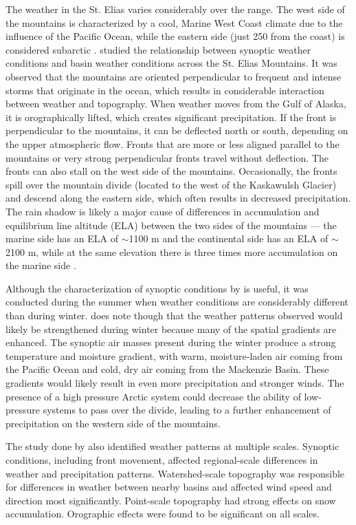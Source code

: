 \documentclass{sfuthesis}
\begin{document}
The weather in the St. Elias varies considerably over the range. The west side of the mountains is characterized by a cool, Marine West Coast climate due to the influence of the Pacific Ocean, while the eastern side (just 250 from the coast) is considered subarctic \citep{Marcus1970}. \cite{Taylor1969} studied the relationship between synoptic weather conditions and basin weather conditions across the St. Elias Mountains. It was observed that the mountains are oriented perpendicular to frequent and intense storms that originate in the ocean, which results in considerable interaction between weather and topography. When weather moves from the Gulf of Alaska, it is orographically lifted, which creates significant precipitation. If the front is perpendicular to the mountains, it can be deflected north or south, depending on the upper atmospheric flow. Fronts that are more or less aligned parallel to the mountains or very strong perpendicular fronts travel without deflection. The fronts can also stall on the west side of the mountains. Occasionally, the fronts spill over the mountain divide (located to the west of the Kaskawulsh Glacier) and descend along the eastern side, which often results in decreased precipitation. The rain shadow is likely a major cause of differences in accumulation and equilibrium line altitude (ELA) between the two sides of the mountains --- the marine side has an ELA of $\sim$1100 m and the continental side has an ELA of $\sim$2100 m, while at the same elevation there is three times more accumulation on the marine side \citep{Marcus1970}.

Although the characterization of synoptic conditions by \cite{Taylor1969} is useful, it was conducted during the summer when weather conditions are considerably different than during winter. \cite{Taylor1969} does note though that the weather patterns observed would likely be strengthened during winter because many of the spatial gradients are enhanced. The synoptic air masses present during the winter produce a strong temperature and moisture gradient, with warm, moisture-laden air coming from the Pacific Ocean and cold, dry air coming from the Mackenzie Basin. These gradients would likely result in even more precipitation and stronger winds. The presence of a high pressure Arctic system could decrease the ability of low-pressure systems to pass over the divide, leading to a further enhancement of precipitation on the western side of the mountains. 

The study done by \cite{Taylor1969} also identified weather patterns at multiple scales. Synoptic conditions, including front movement, affected regional-scale differences in weather and precipitation patterns. Watershed-scale topography was responsible for differences in weather between nearby basins and affected wind speed and direction most significantly. Point-scale topography had strong effects on snow accumulation. Orographic effects were found to be significant on all scales. 
\end{document}
